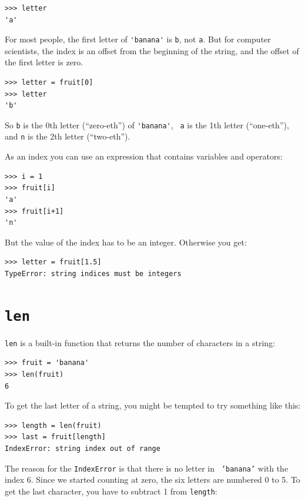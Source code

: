 \documentclass[10pt]{book}
\begin{document}
\begin{verbatim}
>>> letter
'a'
\end{verbatim}
%
For most people, the first letter of \verb"'banana'" is {\tt b}, not
{\tt a}.  But for computer scientists, the index is an offset from the
beginning of the string, and the offset of the first letter is zero.

\begin{verbatim}
>>> letter = fruit[0]
>>> letter
'b'
\end{verbatim}
%
So {\tt b} is the 0th letter (``zero-eth'') of \verb"'banana'", {\tt
  a} is the 1th letter (``one-eth''), and {\tt n} is the 2th letter
(``two-eth'').   

As an index you can use an expression that contains variables and
operators:

\begin{verbatim}
>>> i = 1
>>> fruit[i]
'a'
>>> fruit[i+1]
'n'
\end{verbatim}
%

But the value of the index has to be an integer.  Otherwise you
get:

\begin{verbatim}
>>> letter = fruit[1.5]
TypeError: string indices must be integers
\end{verbatim}
%

\section{{\tt len}}

{\tt len} is a built-in function that returns the number of characters
in a string:

\begin{verbatim}
>>> fruit = 'banana'
>>> len(fruit)
6
\end{verbatim}
%
To get the last letter of a string, you might be tempted to try something
like this:

\begin{verbatim}
>>> length = len(fruit)
>>> last = fruit[length]
IndexError: string index out of range
\end{verbatim}
%
The reason for the {\tt IndexError} is that there is no letter in {\tt
'banana'} with the index 6.  Since we started counting at zero, the
six letters are numbered 0 to 5.  To get the last character, you have
to subtract 1 from {\tt length}:
\end{document}
